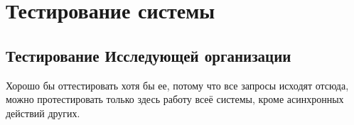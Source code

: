 \chapter{Тестирование системы}
\label{cha:appendix1}

\section{Тестирование Исследующей организации}

Хорошо бы оттестировать хотя бы ее, потому что все запросы исходят отсюда, можно протестировать только здесь работу всеё системы, кроме асинхронных действий других.


